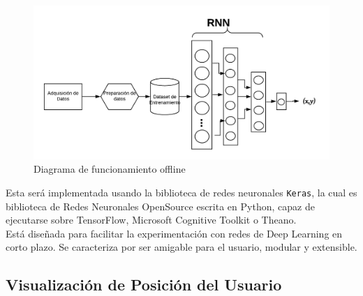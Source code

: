 \begin{figure}[h!]
    \centering
    \includegraphics[scale=0.8]{./images/Red_offline}
    \caption{Diagrama de funcionamiento offline}
    \label{fig:Red_offline}
\end{figure}

Esta será implementada usando la biblioteca de redes neuronales \texttt{Keras}, la cual es biblioteca de Redes Neuronales OpenSource escrita en Python, capaz de ejecutarse sobre TensorFlow, Microsoft Cognitive Toolkit o Theano.\\

Está diseñada para facilitar la experimentación con redes de Deep Learning en corto plazo. Se caracteriza por ser amigable para el usuario, modular y extensible.

\newpage
\subsection{Visualización de Posición del Usuario}

